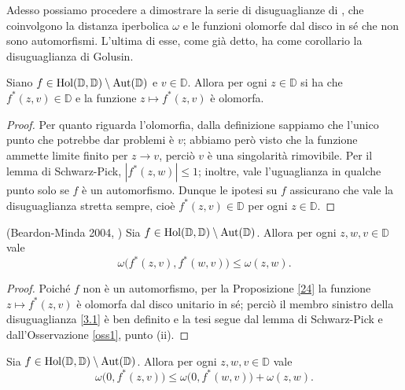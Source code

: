 Adesso possiamo procedere a dimostrare la serie di disuguaglianze di \cite{BM}, che coinvolgono la distanza iperbolica $\omega$ e le funzioni olomorfe dal disco in sé che non sono automorfismi. L'ultima di esse, come già detto, ha come corollario la disuguaglianza di Golusin.

\begin{prop} \label{24}
  Siano $f \in \text{\normalfont{Hol}}(\mathbb{D},\mathbb{D})\setminus\text{\normalfont{Aut}}(\mathbb{D})$ e $v \in \mathbb{D}$. Allora per ogni $z \in \mathbb{D}$ si ha che $f^*(z,v) \in \mathbb{D}$ e la funzione $z \longmapsto f^*(z,v)$ è olomorfa.
\end{prop}

\begin{proof}
  Per quanto riguarda l'olomorfia, dalla definizione sappiamo che l'unico punto che potrebbe dar problemi è $v$; abbiamo però visto che la funzione ammette limite finito per $z \longrightarrow v$, perciò $v$ è una singolarità rimovibile. Per il lemma di Schwarz-Pick, $|f^*(z,w)| \le 1$; inoltre, vale l'uguaglianza in qualche punto solo se $f$ è un automorfismo. Dunque le ipotesi su $f$ assicurano che vale la disuguaglianza stretta sempre, cioè $f^*(z,v) \in \mathbb{D}$ per ogni $z \in \mathbb{D}$.
\end{proof}

\begin{thm} \label{31}
  (Beardon-Minda 2004, \cite{BM}) Sia $f \in \text{\normalfont{Hol}}(\mathbb{D},\mathbb{D})\setminus\text{\normalfont{Aut}}(\mathbb{D})$. Allora per ogni $z, w, v \in \mathbb{D}$ vale
  \begin{equation} \label{3.1}
    \omega\bigl(f^*(z,v),f^*(w,v)\bigr) \le \omega(z,w).
  \end{equation}
\end{thm}

\begin{proof}
  Poiché $f$ non è un automorfismo, per la Proposizione \ref{24} la funzione $z \longmapsto f^*(z,v)$ è olomorfa dal disco unitario in sé; perciò il membro sinistro della disuguaglianza \eqref{3.1} è ben definito e la tesi segue dal lemma di Schwarz-Pick e dall'Osservazione \ref{oss1}, punto (ii).
\end{proof}

\begin{cor} \label{32}
  Sia $f \in \text{\normalfont{Hol}}(\mathbb{D},\mathbb{D})\setminus\text{\normalfont{Aut}}(\mathbb{D})$. Allora per ogni $z, w, v \in \mathbb{D}$ vale
  \begin{equation}
    \omega\bigl(0, f^*(z,v)\bigr) \le \omega\bigl(0,f^*(w,v)\bigr)+\omega(z,w).
  \end{equation}
\end{cor}

